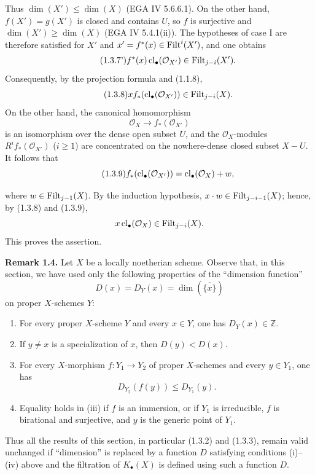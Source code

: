 Thus $\dim(X')\leq\dim(X)$ (EGA IV 5.6.6.1). On the other hand,
$f(X')=g(X')$ is closed and contains $U$, so $f$ is surjective and
$\dim(X')\geq\dim(X)$ (EGA IV 5.4.1(ii)). The hypotheses of case I are
therefore satisfied for $X'$ and $x'=f^*(x)\in\operatorname{Filt}^i(X')$, and one obtains
\begin{equation}\tag{1.3.7'}
f^*(x)\operatorname{cl}_\bullet(\mathcal O_{X'})\in\operatorname{Filt}_{j-i}(X').
\end{equation}
Consequently, by the projection formula and (1.1.8),
\begin{equation}\tag{1.3.8}
x f_*(\operatorname{cl}_\bullet(\mathcal O_{X'}))\in\operatorname{Filt}_{j-i}(X).
\end{equation}
On the other hand, the canonical homomorphism
\[
\mathcal O_X\longrightarrow f_*(\mathcal O_{X'})
\]
is an isomorphism over the dense open subset $U$, and the
$\mathcal O_X$-modules $R^if_*(\mathcal O_{X'})$ ($i\geq1$) are concentrated
on the nowhere-dense closed subset $X-U$. It follows that
\begin{equation}\tag{1.3.9}
f_*(\operatorname{cl}_\bullet(\mathcal O_{X'}))=\operatorname{cl}_\bullet(\mathcal O_X)+w,
\end{equation}

where $w\in\operatorname{Filt}_{j-1}(X)$. By the induction hypothesis,
$x\cdot w\in\operatorname{Filt}_{j-i-1}(X)$; hence, by (1.3.8) and (1.3.9),
\[
x\operatorname{cl}_\bullet(\mathcal O_X)\in\operatorname{Filt}_{j-i}(X).
\]
This proves the assertion.

\textbf{Remark 1.4.}
Let $X$ be a locally noetherian scheme. Observe that, in this section, we
have used only the following properties of the ``dimension function''
\[
D(x)=D_Y(x)=\dim(\overline{\{x\}})
\]
on proper $X$-schemes $Y$:
\begin{enumerate}[label=(\roman*)]
\item For every proper $X$-scheme $Y$ and every $x\in Y$, one has
  $D_Y(x)\in\mathbb Z$.
\item If $y\ne x$ is a specialization of $x$, then $D(y)<D(x)$.
\item For every $X$-morphism $f:Y_1\to Y_2$ of proper $X$-schemes and every
  $y\in Y_1$, one has
  \[
  D_{Y_2}(f(y))\leq D_{Y_1}(y).
  \]
\item Equality holds in (iii) if $f$ is an immersion, or if $Y_1$ is
  irreducible, $f$ is birational and surjective, and $y$ is the generic point
  of $Y_1$.
\end{enumerate}
Thus all the results of this section, in particular (1.3.2) and (1.3.3),
remain valid unchanged if ``dimension'' is replaced by a function $D$
satisfying conditions (i)--(iv) above and the filtration of $K_\bullet(X)$ is
defined using such a function $D$.

